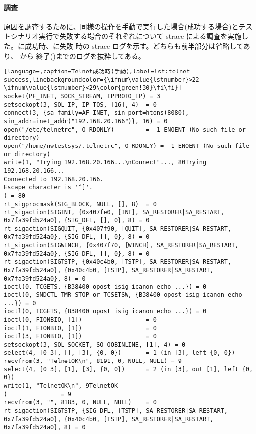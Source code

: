     \paragraph{調査}

原因を調査するために、同様の操作を手動で実行した場合(成功する場合)とテス
トシナリオ実行で失敗する場合のそれぞれについて strace による調査を実施し
た。に成功時、に失敗
時の strace ログを示す。どちらも前半部分は省略してあり、
から 終了()までのログを抜粋してある。

\begin{lstlisting}[language=,caption=Telnet成功時(手動),label=lst:telnet-success,linebackgroundcolor={\ifnum\value{lstnumber}>22 \ifnum\value{lstnumber}<29\color{green!30}\fi\fi}]
socket(PF_INET, SOCK_STREAM, IPPROTO_IP) = 3
setsockopt(3, SOL_IP, IP_TOS, [16], 4)  = 0
connect(3, {sa_family=AF_INET, sin_port=htons(8080), sin_addr=inet_addr("192.168.20.166")}, 16) = 0
open("/etc/telnetrc", O_RDONLY)         = -1 ENOENT (No such file or directory)
open("/home/nwtestsys/.telnetrc", O_RDONLY) = -1 ENOENT (No such file or directory)
write(1, "Trying 192.168.20.166...\nConnect"..., 80Trying 192.168.20.166...
Connected to 192.168.20.166.
Escape character is '^]'.
) = 80
rt_sigprocmask(SIG_BLOCK, NULL, [], 8)  = 0
rt_sigaction(SIGINT, {0x407fe0, [INT], SA_RESTORER|SA_RESTART, 0x7fa39fd524a0}, {SIG_DFL, [], 0}, 8) = 0
rt_sigaction(SIGQUIT, {0x407f90, [QUIT], SA_RESTORER|SA_RESTART, 0x7fa39fd524a0}, {SIG_DFL, [], 0}, 8) = 0
rt_sigaction(SIGWINCH, {0x407f70, [WINCH], SA_RESTORER|SA_RESTART, 0x7fa39fd524a0}, {SIG_DFL, [], 0}, 8) = 0
rt_sigaction(SIGTSTP, {0x40c4b0, [TSTP], SA_RESTORER|SA_RESTART, 0x7fa39fd524a0}, {0x40c4b0, [TSTP], SA_RESTORER|SA_RESTART, 0x7fa39fd524a0}, 8) = 0
ioctl(0, TCGETS, {B38400 opost isig icanon echo ...}) = 0
ioctl(0, SNDCTL_TMR_STOP or TCSETSW, {B38400 opost isig icanon echo ...}) = 0
ioctl(0, TCGETS, {B38400 opost isig icanon echo ...}) = 0
ioctl(0, FIONBIO, [1])                  = 0
ioctl(1, FIONBIO, [1])                  = 0
ioctl(3, FIONBIO, [1])                  = 0
setsockopt(3, SOL_SOCKET, SO_OOBINLINE, [1], 4) = 0
select(4, [0 3], [], [3], {0, 0})       = 1 (in [3], left {0, 0})
recvfrom(3, "TelnetOK\n", 8191, 0, NULL, NULL) = 9
select(4, [0 3], [1], [3], {0, 0})      = 2 (in [3], out [1], left {0, 0})
write(1, "TelnetOK\n", 9TelnetOK
)               = 9
recvfrom(3, "", 8183, 0, NULL, NULL)    = 0
rt_sigaction(SIGTSTP, {SIG_DFL, [TSTP], SA_RESTORER|SA_RESTART, 0x7fa39fd524a0}, {0x40c4b0, [TSTP], SA_RESTORER|SA_RESTART, 0x7fa39fd524a0}, 8) = 0

\end{lstlisting}
